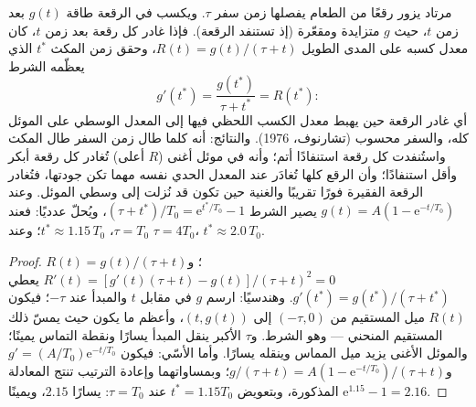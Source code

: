 \begin{theorem}\label{thm:b3:behavioural-ecology:mvt}
مرتاد يزور رقعًا من الطعام يفصلها زمن سفر $\tau$. ويكسب في
الرقعة طاقة $g(t)$ بعد زمن $t$، حيث $g$ متزايدة ومقعّرة (إذ
تستنفد الرقعة). فإذا غادر كل رقعة بعد زمن $t$، كان معدل كسبه
على المدى الطويل $R(t) = g(t)/(\tau + t)$، وحقق زمن المكث
$t^{*}$ الذي يعظّمه الشرط
\[
g'(t^{*}) = \frac{g(t^{*})}{\tau + t^{*}} = R(t^{*}) :
\]
أي غادر الرقعة حين يهبط معدل الكسب اللحظي فيها إلى المعدل
الوسطي على الموئل كله، والسفر محسوب (تشارنوف،
1976). والنتائج: أنه كلما طال زمن السفر طال المكث
واستُنفدت كل رقعة استنفادًا أتم؛ وأنه في موئل أغنى
($R$ أعلى) تُغادر كل رقعة أبكر وأقل استنفادًا؛ وأن الرقع كلها
تُغادَر عند المعدل الحدي نفسه مهما تكن جودتها، فتُغادر
الرقعة الفقيرة فورًا تقريبًا والغنية حين
تكون قد نُزلت إلى وسطي الموئل. وعند $g(t) = A(1 -
\mathrm{e}^{-t/T_{0}})$ يصير الشرط $(\tau + t^{*})/T_{0} =
\mathrm{e}^{t^{*}/T_{0}} - 1$، ويُحلّ عدديًا: فعند $\tau = T_{0}$،
$t^{*} \approx 1.15\,T_{0}$؛ وعند $\tau = 4T_{0}$، $t^{*} \approx
2.0\,T_{0}$.
\end{theorem}
\begin{proof}
$R(t) = g(t)/(\tau + t)$؛ و$R'(t) = [g'(t)(\tau + t) - g(t)]/(\tau +
t)^{2} = 0$ يعطي $g'(t^{*}) = g(t^{*})/(\tau + t^{*})$. وهندسيًا:
ارسم $g$ في مقابل $t$ والمبدأ عند $-\tau$؛ فيكون $R(t)$ ميل
المستقيم من $(-\tau, 0)$ إلى $(t, g(t))$، وأعظم ما يكون حيث
يمسّ ذلك المستقيم المنحني --- وهو الشرط. و$\tau$ الأكبر ينقل
المبدأ يسارًا ونقطة التماس يمينًا؛ والموئل الأغنى يزيد ميل
المماس وينقله يسارًا. وأما الأسّي: فيكون $g' = (A/T_{0})
\mathrm{e}^{-t/T_{0}}$ و$g/(\tau + t) = A(1 - \mathrm{e}^{-t/T_{0}})/
(\tau + t)$؛ وبمساواتهما وإعادة الترتيب تنتج المعادلة المذكورة،
وبتعويض $t^{*} = 1.15T_{0}$ عند $\tau = T_{0}$: يسارًا $2.15$، ويمينًا
$\mathrm{e}^{1.15} - 1 = 2.16$.
\end{proof}

